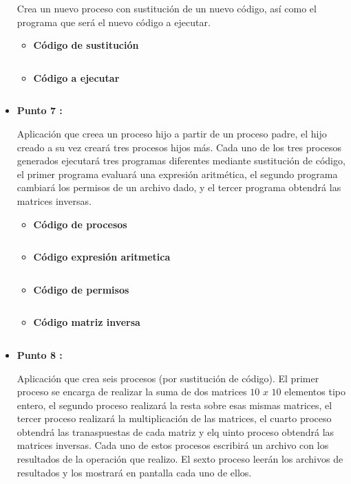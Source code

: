 \documentclass[12pt]{article}
\begin{document}
\begin{itemize}
        	        Crea un nuevo proceso con sustitución de un nuevo código, así como el programa que será el nuevo código a ejecutar.
        	        \begin{itemize}
                        \item \textbf{Código de sustitución}
                            \inputminted{octave}{Code/Linux/6_1.c}
                        \item \textbf{Código a ejecutar}
                            \inputminted{octave}{Code/Linux/6_2.c}  
                    \end{itemize}
                
                \item[\Checkmark] \textbf{Punto 7 :}

                    Aplicación que creea un proceso hijo a partir de un proceso padre, el hijo creado a su vez creará tres procesos hijos más. Cada uno de los tres procesos generados ejecutará tres programas diferentes mediante sustitución de código, el primer programa evaluará una expresión aritmética, el segundo programa cambiará los permisos de un archivo dado, y el tercer programa obtendrá las matrices inversas.

                    \begin{itemize}
                        \item \textbf{Código de procesos}
                            \inputminted{octave}{Code/Linux/7.c}
                        
                        \item \textbf{Código expresión aritmetica}
                            \inputminted{octave}{Code/Linux/expresion.c}

                        \item \textbf{Código de permisos}
                            \inputminted{octave}{Code/Linux/permisos.c}

                        \item \textbf{Código matriz inversa}
                            \inputminted{octave}{Code/Linux/inversa.c}  
                    \end{itemize}

                \item[\Checkmark] \textbf{Punto 8 :}
                    
                    Aplicación que crea seis procesos (por sustitución de código). El primer proceso se encarga de realizar la suma de dos matrices $10$ $x$ $10$ elementos tipo entero, el segundo proceso realizará la resta sobre esas mismas matrices, el tercer proceso realizará la multiplicación de las matrices, el cuarto proceso obtendrá las tranaspuestas de cada matriz y elq uinto proceso obtendrá las matrices inversas. Cada uno de estos procesos escribirá un archivo con los resultados de la operación que realizo. El sexto proceso leerán los archivos de resultados y los mostrará en pantalla cada uno de ellos.


\end{itemize}
\end{document}
